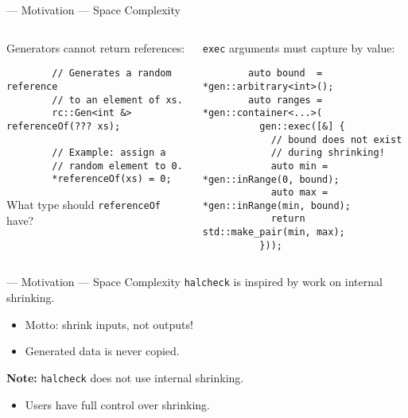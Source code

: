 \begin{frame}[fragile]{\halcheck{} --- Motivation --- Space Complexity}
  \begin{columns}[t]
    \begin{block}{Generators cannot return references:}
      \begin{verbatim}
        // Generates a random reference
        // to an element of xs.
        rc::Gen<int &> referenceOf(??? xs);

        // Example: assign a
        // random element to 0.
        *referenceOf(xs) = 0;
      \end{verbatim}

      What type should \texttt{referenceOf} have?
    \end{block}

    \pause{}

    \begin{block}{\texttt{exec} arguments must capture by value:}
      \begin{verbatim}
        auto bound  = *gen::arbitrary<int>();
        auto ranges = *gen::container<...>(
          gen::exec([&] {
            // bound does not exist
            // during shrinking!
            auto min = *gen::inRange(0, bound);
            auto max = *gen::inRange(min, bound);
            return std::make_pair(min, max);
          }));
      \end{verbatim}
    \end{block}
  \end{columns}
\end{frame}

\begin{frame}{\halcheck{} --- Motivation --- Space Complexity}
  \texttt{halcheck} is inspired by work on \alert{internal shrinking}.
  \begin{itemize}
    \item Motto: shrink inputs, not outputs!
    \item Generated data is never copied.
  \end{itemize}

  \textbf{Note:} \texttt{halcheck} does \alert{not} use internal shrinking.
  \begin{itemize}
    \item Users have full control over shrinking.
  \end{itemize}
\end{frame}

